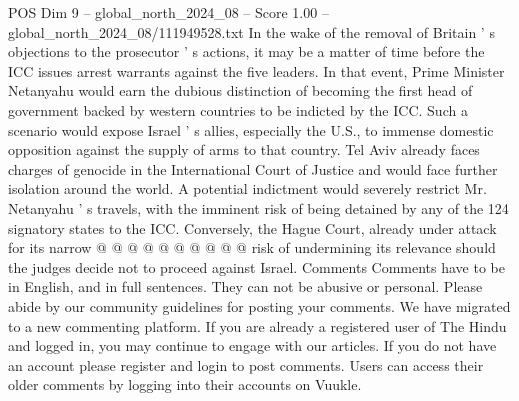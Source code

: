 \begin{textsample}{POS Dim 9 – global\_north\_2024\_08 – Score 1.00 – global\_north\_2024\_08/111949528.txt}
In the wake of the removal of Britain ' s objections to the prosecutor ' s actions, it may be a matter of time before the ICC issues arrest warrants against the five leaders.
In that event, Prime Minister Netanyahu would earn the dubious distinction of becoming the first head of government backed by western countries to be indicted by the ICC.
Such a scenario would expose Israel ' s allies, especially the U.S., to immense domestic opposition against the supply of arms to that country.
Tel Aviv already faces charges of genocide in the International Court of Justice and would face further isolation around the world.
A potential indictment would severely restrict Mr.
Netanyahu ' s travels, with the imminent risk of being detained by any of the 124 signatory states to the ICC.
Conversely, the Hague Court, already under attack for its narrow @ @ @ @ @ @ @ @ @ @ risk of undermining its relevance should the judges decide not to proceed against Israel.
Comments Comments have to be in English, and in full sentences.
They can not be abusive or personal.
Please abide by our community guidelines for posting your comments.
We have migrated to a new commenting platform.
If you are already a registered user of The Hindu and logged in, you may continue to engage with our articles.
If you do not have an account please register and login to post comments.
Users can access their older comments by logging into their accounts on Vuukle.

\end{textsample}
